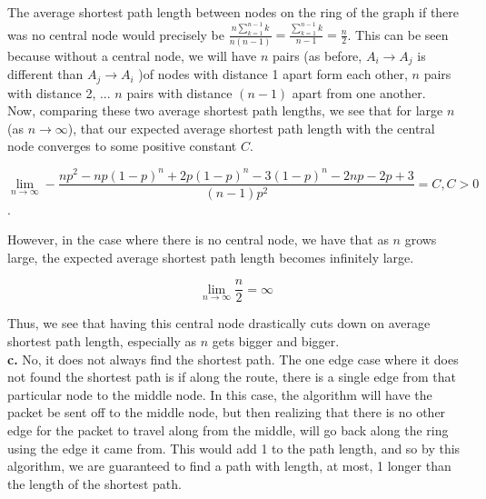 \documentclass[12 pt]{article}
\begin{document}
	\noindent The average shortest path length between nodes on the ring of the graph if there was no central node would precisely be $\frac{n\sum_{k=1}^{n-1} k}{n(n-1)} = \frac{\sum_{k=1}^{n-1} k}{n-1} = \frac{n}{2}$. This can be seen because without a central node, we will have $n$ pairs (as before, $A_i \rightarrow A_j$ is different than $A_j \rightarrow A_i$ )of nodes with distance 1 apart form each other, $n$ pairs with distance 2, ... $n$ pairs with distance $(n-1)$ apart from one another. \\
	
	\noindent Now, comparing these two average shortest path lengths, we see that for large $n$ (as $n \rightarrow \infty$), that our expected average shortest path length with the central node converges to some positive constant $C$.
	
	\[\lim_{n\rightarrow \infty} -\frac{np^2 - np(1-p)^n + 2p(1-p)^n - 3(1-p)^n - 2np - 2p + 3}{(n-1)p^2} = C, C > 0\].
	
	\noindent However, in the case where there is no central node, we have that as $n$ grows large, the expected average shortest path length becomes infinitely large. 
	
	\[\lim_{n\rightarrow \infty} \frac{n}{2} = \infty \]
	
	\noindent Thus, we see that having this central node drastically cuts down on average shortest path length, especially as $n$ gets bigger and bigger. \\
	
	\noindent \textbf {c.} No, it does not always find the shortest path. The one edge case where it does not found the shortest path is if along the route, there is a single edge from that particular node to the middle node. In this case, the algorithm will have the packet be sent off to the middle node, but then realizing that there is no other edge for the packet to travel along from the middle, will go back along the ring using the edge it came from. This would add 1 to the path length, and so by this algorithm, we are guaranteed to find a path with length, at most, 1 longer than the length of the shortest path.
	
\end{document}

